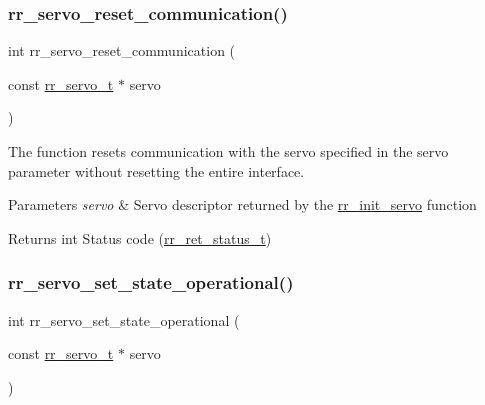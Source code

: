 \subsubsection{\texorpdfstring{rr\+\_\+servo\+\_\+reset\+\_\+communication()}{rr\_servo\_reset\_communication()}}
{\footnotesize\ttfamily int rr\+\_\+servo\+\_\+reset\+\_\+communication (\begin{DoxyParamCaption}\item[{const \hyperlink{structrr__servo__t}{rr\+\_\+servo\+\_\+t} $\ast$}]{servo }\end{DoxyParamCaption})}



The function resets communication with the servo specified in the \textquotesingle{}servo\textquotesingle{} parameter without resetting the entire interface. 


\begin{DoxyParams}{Parameters}
{\em servo} & Servo descriptor returned by the \hyperlink{group___init_ga0adb313a3eeb8a4399431e940a1f3e9e}{rr\+\_\+init\+\_\+servo} function \\
\hline
\end{DoxyParams}
\begin{DoxyReturn}{Returns}
int Status code (\hyperlink{api_8h_a92d5be5038abcf89837faf85a08debdc}{rr\+\_\+ret\+\_\+status\+\_\+t}) 
\end{DoxyReturn}
\mbox{\label{group___state_ga799d61d6eb811cba7f9097a5d9bfd0a8}} 
\subsubsection{\texorpdfstring{rr\+\_\+servo\+\_\+set\+\_\+state\+\_\+operational()}{rr\_servo\_set\_state\_operational()}}
{\footnotesize\ttfamily int rr\+\_\+servo\+\_\+set\+\_\+state\+\_\+operational (\begin{DoxyParamCaption}\item[{const \hyperlink{structrr__servo__t}{rr\+\_\+servo\+\_\+t} $\ast$}]{servo }\end{DoxyParamCaption})}



